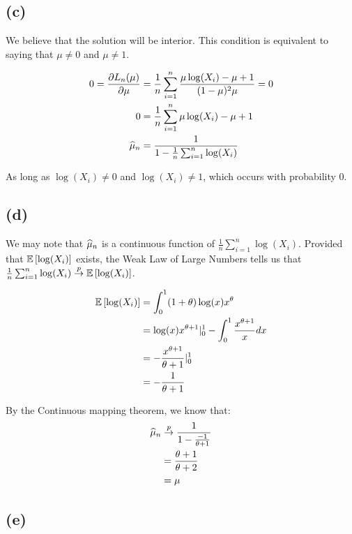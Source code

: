 \documentclass[12pt]{paper}
\begin{document}
\subsection{(c)}

We believe that the solution will be interior. This condition is
equivalent to saying that $\mu \neq 0$ and $\mu \neq 1$.

\begin{align*}
  0 = \frac{ \partial L_n(\mu)}{ \partial \mu} &= \frac{1}{n} \sum_{i=1}^n \frac{\mu \log(X_i) - \mu +
                      1}{(1-\mu)^2\mu} = 0\\
  0 &= \frac{1}{n} \sum_{i=1}^n \mu \log(X_i) - \mu + 1\\
  \widehat{ \mu }_{n} &= \frac{1}{1 - \frac{1}{n} \sum_{i=1}^n \log(X_i)}   
\end{align*}

As long as $\log(X_i) \neq 0$ and $\log(X_i)\neq 1$, which occurs with
probability $0$.

\subsection{(d)}

We may note that $\widehat{ \mu }_{n}$ is a continuous function of $\frac{1}{n}
\sum_{i=1}^n \log( X_i)$. Provided that $\mathbb{E} \left [  \log( X_i) \right ]$ exists, the
Weak Law of Large Numbers tells us that $\frac{1}{n} \sum_{i=1}^n \log(
X_i) \overset{p}{\to} \mathbb{E} \left [  \log( X_i) \right ]$.

\begin{align*}
  \mathbb{E} \left [  \log( X_i) \right ] &= \int_0^1 (1+\theta) \log( x ) x^{\theta}\\
                    &=  \log( x) x^{\theta+1} \vert_0^1 - \int_0^1 \frac{x^{\theta+1}}{x}dx\\
                    &= -\frac{x^{\theta+1}}{\theta+1} \vert_0^1\\
  &= - \frac{1}{\theta+1}
\end{align*}

By the Continuous mapping theorem, we know that:
\begin{align*}
  \widehat{ \mu }_{n} &\overset{p}{\to} \frac{1}{1 - \frac{-1}{\theta+1}}\\
          &= \frac{\theta+1}{\theta+2}\\
  &= \mu
\end{align*}

\subsection{(e)}
\end{document}

